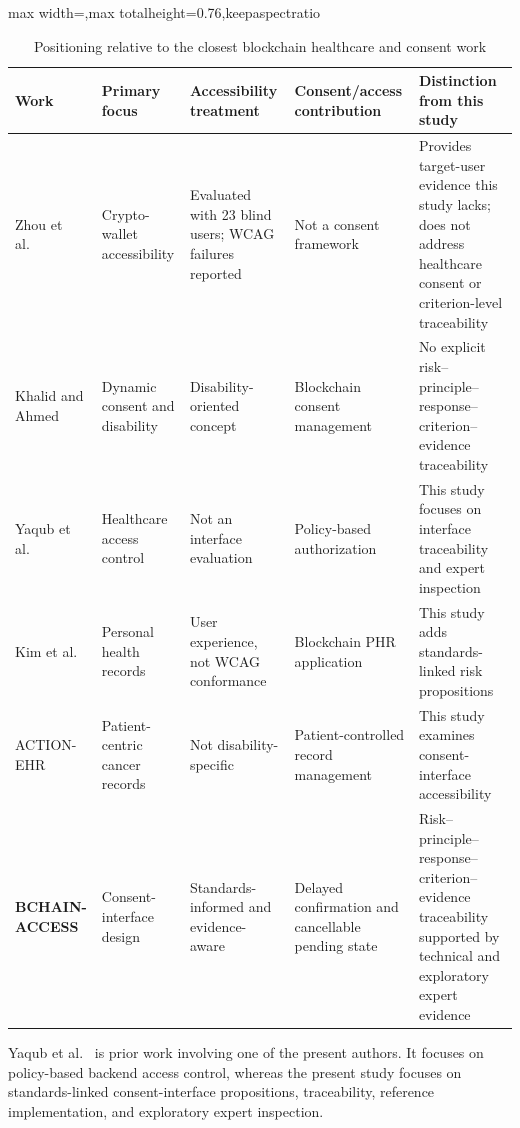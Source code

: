 \documentclass[journal]{IEEEtran}
\begin{document}
\begin{table}[!htbp]
\centering
\small
\caption{Positioning relative to the closest blockchain healthcare and consent work}
\label{tab:related-comparison}
\begin{adjustbox}{max width=\textwidth,max totalheight=0.76\textheight,keepaspectratio}
\begin{tabular}{|p{3.3cm}|p{2.5cm}|p{2.7cm}|p{2.8cm}|p{3.2cm}|}
\hline
\textbf{Work} & \textbf{Primary focus} & \textbf{Accessibility treatment} & \textbf{Consent/access contribution} & \textbf{Distinction from this study} \\
\hline
Zhou et al.~\cite{zhou2023accessible} & Crypto-wallet accessibility & Evaluated with 23 blind users; WCAG failures reported & Not a consent framework & Provides target-user evidence this study lacks; does not address healthcare consent or criterion-level traceability \\
\hline
Khalid and Ahmed~\cite{khalid2023blockchain} & Dynamic consent and disability & Disability-oriented concept & Blockchain consent management & No explicit risk--principle--response--criterion--evidence traceability \\
\hline
Yaqub et al.~\cite{yaqub2025blockchain} & Healthcare access control & Not an interface evaluation & Policy-based authorization & This study focuses on interface traceability and expert inspection \\
\hline
Kim et al.~\cite{kim2022blockchain} & Personal health records & User experience, not WCAG conformance & Blockchain PHR application & This study adds standards-linked risk propositions \\
\hline
ACTION-EHR~\cite{dubovitskaya2020action} & Patient-centric cancer records & Not disability-specific & Patient-controlled record management & This study examines consent-interface accessibility \\
\hline
\textbf{BCHAIN-ACCESS} & Consent-interface design & Standards-informed and evidence-aware & Delayed confirmation and cancellable pending state & Risk--principle--response--criterion--evidence traceability supported by technical and exploratory expert evidence \\
\hline
\end{tabular}
\end{adjustbox}
\end{table}

Yaqub et al.~\cite{yaqub2025blockchain} is prior work involving one of the present authors. It focuses on policy-based backend access control, whereas the present study focuses on standards-linked consent-interface propositions, traceability, reference implementation, and exploratory expert inspection.
\end{document}
